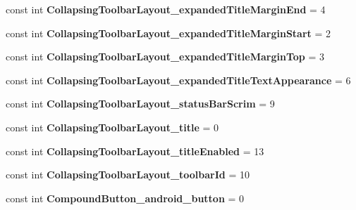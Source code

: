 \begin{DoxyCompactItemize}
const int {\bfseries Collapsing\+Toolbar\+Layout\+\_\+expanded\+Title\+Margin\+End} = 4
\item 
\mbox{\label{classXaria_1_1Resource_1_1Styleable_ac5340a6cefd614fb205ff498bf771fde}} 
const int {\bfseries Collapsing\+Toolbar\+Layout\+\_\+expanded\+Title\+Margin\+Start} = 2
\item 
\mbox{\label{classXaria_1_1Resource_1_1Styleable_ad52595e6ea6846bb7fe09ee8a199e398}} 
const int {\bfseries Collapsing\+Toolbar\+Layout\+\_\+expanded\+Title\+Margin\+Top} = 3
\item 
\mbox{\label{classXaria_1_1Resource_1_1Styleable_a6a4d5b2cbd3d9e42bf7dba13f687c34a}} 
const int {\bfseries Collapsing\+Toolbar\+Layout\+\_\+expanded\+Title\+Text\+Appearance} = 6
\item 
\mbox{\label{classXaria_1_1Resource_1_1Styleable_a4f71791fddef0bc8d972df562cc779cb}} 
const int {\bfseries Collapsing\+Toolbar\+Layout\+\_\+status\+Bar\+Scrim} = 9
\item 
\mbox{\label{classXaria_1_1Resource_1_1Styleable_aafc8d13bda6a0ab5efe911def8f331be}} 
const int {\bfseries Collapsing\+Toolbar\+Layout\+\_\+title} = 0
\item 
\mbox{\label{classXaria_1_1Resource_1_1Styleable_ab8d08ee15beead0edc3e8c2c86748f76}} 
const int {\bfseries Collapsing\+Toolbar\+Layout\+\_\+title\+Enabled} = 13
\item 
\mbox{\label{classXaria_1_1Resource_1_1Styleable_ad088e65e6837d114051f7efb1acde761}} 
const int {\bfseries Collapsing\+Toolbar\+Layout\+\_\+toolbar\+Id} = 10
\item 
\mbox{\label{classXaria_1_1Resource_1_1Styleable_a1a5e0e0c355437c5602732f1bace39d7}} 
const int {\bfseries Compound\+Button\+\_\+android\+\_\+button} = 0
\item 
\mbox{\label{classXaria_1_1Resource_1_1Styleable_aaefc954fc8c9ff276399724eb4cacb44}} 

\end{DoxyCompactItemize}
